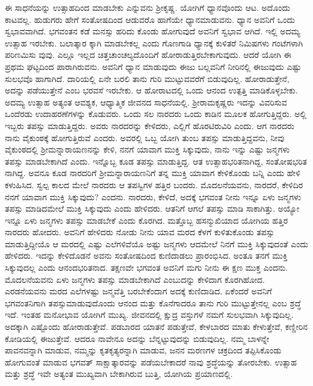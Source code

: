 ಈ ಸಾಧನೆಯನ್ನು ಉತ್ಸಾಹದಿಂದ ಮಾಡಬೇಕು ಎನ್ನುವನು ಶ್ರೀಕೃಷ್ಣ. ಯೋಗಿಗೆ ಧ್ಯಾನವೊಂದು ಆಟ. ಅದೊಂದು ಕಾಟವಲ್ಲ. ಹುಡುಗರು ಹೇಗೆ ಸಂತೋಷದಿಂದ ಆಡುವರೊ ಹಾಗೆಯೇ ಧ್ಯಾನಮಾಡುವನು. ಧ್ಯಾನ ಅವನಿಗೆ ಒಂದು ಸ್ವಭಾವವಾಗಿದೆ. ಭಗವಂತನ ಕಡೆ ಮನಸ್ಸು ಹರಿದು ಕೊಂಡು ಹೋಗುವುದೆ ಅವನಿಗೆ ಸ್ವಭಾವ ಆಗಿದೆ. ಇಲ್ಲಿ ಅದಮ್ಯ ಉತ್ಸಾಹ ಇರಬೇಕು. ಬಲಾತ್ಕಾರ ಕ್ಕಾಗಿ ಮಾಡಬೇಕಲ್ಲ ಎಂದು ಗೊಣಗಾಡಿ ಧ್ಯಾನಕ್ಕೆ ಕುಳಿತರೆ ನಿಮಿಷಗಳು ಗಂಟೆಗಳಾಗಿ ಪರಿಣಮಿಸು ವುವು. ಎಲ್ಲೂ ಇಲ್ಲದ ಚಿತ್ತಚಾಂಚಲ್ಯದೊಂದಿಗೆ ಹೋರಾಡುತ್ತಿರಬೇಕಾಗುವುದು. ಆದರೆ ಯೋಗಿ ಈ ಪ್ರಥಮ ಘಟ್ಟದಿಂದ ಪಾರಾಗಿರುವನು. ಅವನಿಗೆ ಧ್ಯಾನ ಮಾಡುವುದು ಈಜು ಬಲ್ಲವನಿಗೆ ನೀರಿನಲ್ಲಿ ಈಜುವುದು ಎಷ್ಟು ಸುಲಭವೊ ಹಾಗಾಗಿದೆ. ದಾರಿಯಲ್ಲಿ ಏನೇ ಬರಲಿ ತಾನು ಗುರಿ ಮುಟ್ಟುವವರೆಗೆ ಬಿಡುವುದಿಲ್ಲ. ಹೋರಾಡುತ್ತೇನೆ, ಅದನ್ನು ಪಡೆಯುತ್ತೇನೆ ಎಂಬ ಭರವಸೆ ಇರಬೇಕು. ಆ ಹೋರಾಟದಲ್ಲಿ ಒಂದು ಆನಂದ ಉತ್ಪತ್ತಿ ಮಾಡಿಕೊಳ್ಳಬೇಕು. ಅದಮ್ಯ ಉತ್ಸಾಹ ಅತ್ಯಂತ ಆವಶ್ಯಕ, ಆಧ್ಯಾತ್ಮಿಕ ಜೀವನದ ಸಾಧನೆಯಲ್ಲಿ. ಶ್ರೀರಾಮಕೃಷ್ಣರು ಇದನ್ನು ವಿವರಿಸುವ ಒಂದೆರಡು ಉದಾಹರಣೆಗಳನ್ನು ಕೊಡುವರು. ಒಂದು ಸಲ ನಾರದರು ಒಂದು ಕಾಡಿನ ಮೂಲಕ ಹೋಗುತ್ತಿದ್ದರು. ಅಲ್ಲಿ ಇಬ್ಬರು ತಪಸ್ಸು ಮಾಡುತ್ತಿದ್ದರು. ಅವರು ನಾರದರನ್ನು ಕೇಳಿದರು, ಎಲ್ಲಿಗೆ ಹೊರಟಿರುವಿರಿ ಎಂದು. ಆಗ ನಾರದರು ನಾನು ವೈಕುಂಠಕ್ಕೆ ಹೋಗುತ್ತಿರುವೆ ಎಂದರು. ಅವರಲ್ಲಿ ಒಬ್ಬ ಯೋಗಿ ತುಂಬ ತಪಸ್ಸು ಮಾಡುತ್ತಿದ್ದವನು, ನೀವು ವೈಕುಂಠದಲ್ಲಿ ಶ್ರೀಮನ್ನಾರಾಯಣನನ್ನು ಕೇಳಿ, ನನಗೆ ಯಾವಾಗ ಮುಕ್ತಿ ಸಿಕ್ಕುವುದು, ನಾನು ಇನ್ನು ಎಷ್ಟು ಜನ್ಮಗಳು ತಪಸ್ಸು ಮಾಡಬೇಕಾಗಿದೆ ಎಂದು. ಇನ್ನೊಬ್ಬ ಕೂಡ ತಪಸ್ಸು ಮಾಡುತ್ತಿದ್ದ. ಆತ ಉತ್ಸಾಹಭರಿತನಾಗಿದ್ದ, ಸಂತೋಷಭರಿತ ನಾಗಿದ್ದ. ಅವನೂ ಕೂಡ ನಾರದರಿಗೆ ಶ್ರೀಮನ್ನಾರಾಯಣನಿಗೆ ತನ್ನ ಮುಕ್ತಿ ಯಾವಾಗ ಕೇಳಿಕೊಂಡು ಬನ್ನಿ ಎಂದು ಹೇಳಿ ಕಳುಹಿಸಿದ. ಸ್ವಲ್ಪ ಕಾಲದ ಮೇಲೆ ನಾರದರು ಆ ತಪಸ್ವಿಗಳ ಹತ್ತಿರ ಬಂದರು. ಮೊದಲನೆಯವನು, ನಾರದರೆ, ಕೇಳಿದಿರ ನನಗೆ ಯಾವಾಗ ಮುಕ್ತಿ ಸಿಕ್ಕುವುದು? ಎಂದನು. ನಾರದರು, ಕೇಳಿದೆ, ಅದಕ್ಕೆ ಭಗವಂತ ನೀನು ಇನ್ನೂ ಏಳು ಜನ್ಮಗಳು ತಪಸ್ಸು ಮಾಡಿದಮೇಲೆ ಮುಕ್ತಿ ಸಿಕ್ಕುವುದು ಎಂದು ಹೇಳಿದರು. ಆತನಿಗೆ ಆಗಲೆ ತಪಸ್ಸು ಮಾಡಿ ಸಾಕಾಗಿತ್ತು. ಅಯ್ಯೋ ಇನ್ನೂ ಏಳು ಜನ್ಮಗಳು ತಪಸ್ಸು ಮಾಡಬೇಕೆ ಎಂದು ಕೊರಗಿದ. ಮತ್ತೊಬ್ಬ ಹಸನ್ಮುಖಿಯಾದ ಯೋಗಿಯ ಹತ್ತಿರ ನಾರದರು ಹೋದರು. ಅವನಿಗೆ ಹೇಳಿದರು ನೋಡು ನೀನು ಯಾವ ಮರದ ಕೆಳಗೆ ಕುಳಿತುಕೊಂಡು ತಪಸ್ಸು ಮಾಡುತ್ತಿದ್ದೀಯೊ ಆ ಮರದಲ್ಲಿ ಎಷ್ಟು ಎಲೆಗಳಿವೆಯೊ ಅಷ್ಟು ಜನ್ಮಗಳು ಆದಮೇಲೆ ನಿನಗೆ ಮುಕ್ತಿ ಸಿಕ್ಕುವುದಂತೆ ಎಂದು ಹೇಳಿದರು. ಇದನ್ನು ಕೇಳಿದೊಡನೆ ಅವನು ಸಂತೋಷದಿಂದ ಕುಣಿದಾಡಲು ಪ್ರಾರಂಭಿಸಿದ. ಅಂತೂ ತನಗೆ ಮುಕ್ತಿ ಸಿಕ್ಕುವುದಲ್ಲ ಎಂದು ಆನಂದಭರಿತನಾದ. ತಕ್ಷಣವೇ ಭಗವಂತ ಅವನಿಗೆ ಮಗು ನೀನು ಈ ಕ್ಷಣ ಮುಕ್ತ ಎಂದನು. ಮೊದಲನೆಯವನು ಏಳು ಜನ್ಮಗಳು ತಪಸ್ಸು ಮಾಡಬೇಕಾಗಿದೆ ಎಂಬುದನ್ನು ಕೇಳಿದಾಗ ಕೊರಗಿಹೋದ. ಎರಡನೆಯವನು ಮರದ ಎಲೆಗಳಷ್ಟು ಜನ್ಮವೆತ್ತಿ ಬರಬೇಕೆಂದಾಗ ಅದಕ್ಕೆ ಕುಣಿದಾಡಿದ. ಏಕೆಂದರೆ ಅವನಿಗೆ ಭಗವಂತನಿಗಾಗಿ ತಪಸ್ಸುಮಾಡುವುದೊಂದು ಆನಂದ ಮತ್ತು ಕೊನೆಗಾದರೂ ತಾನು ಗುರಿ ಮುಟ್ಟುತ್ತೇನಲ್ಲ ಎಂಬ ಶ್ರದ್ಧೆ ಇದೆ. ಇಂತಹ ಮನೋಭಾವ ಯೋಗಿಗೆ ಮುಖ್ಯ. ಜೀವನದಲ್ಲಿ ಕ್ಷುದ್ರ ವಸ್ತುಗಳೆ ನಮಗೆ ಸುಲಭವಾಗಿ ಸಿಕ್ಕುವುದಿಲ್ಲ. ಅದಕ್ಕಾಗಿ ಎಷ್ಟೊಂದು ಹೋರಾಡುತ್ತೇವೆ. ಪಡಬಾರದ ಯಾತನೆ ಪಡುತ್ತೇವೆ, ಕೇಳಬಾರದ ಮಾತು ಕೇಳುತ್ತೇವೆ, ಕಣ್ಣೀರಿನ ಕೋಡಿಯಲ್ಲಿ ಈಜುತ್ತೇವೆ. ಆದರೂ ನಾವೇನೂ ಅದನ್ನು ಬೆನ್ನಟ್ಟುವುದನ್ನು ಬಿಡುವುದಿಲ್ಲ. ನಮ್ಮ ಬಾಳನ್ನೇ ಪಾವನವನ್ನಾಗಿ ಮಾಡುವ, ನಮ್ಮನ್ನು ಕೃತಕೃತ್ಯರನ್ನಾಗಿ ಮಾಡುವ, ಜನನ ಮರಣಗಳ ಚಕ್ರದಿಂದ ತಪ್ಪಿಸಿಕೊಂಡು ಹೋಗುವಂತೆ ಮಾಡುವ ಭಗವತ್ ಸಾಕ್ಷಾತ್ಕಾರವನ್ನು ಪಡೆಯಬೇಕಾದರೆ ನಾವು ಶ್ರದ್ಧೆಯನ್ನು ತೋರಬೇಕು. ಉತ್ಸಾಹ ಮತ್ತು ಶ್ರದ್ಧೆ ಇವೇ ಅತ್ಯಂತ ಮುಖ್ಯವಾಗಿ ಬೇಕಾಗಿರುವ ಬುತ್ತಿ, ಯೋಗಿಯ ಪ್ರಯಾಣದಲ್ಲಿ.


